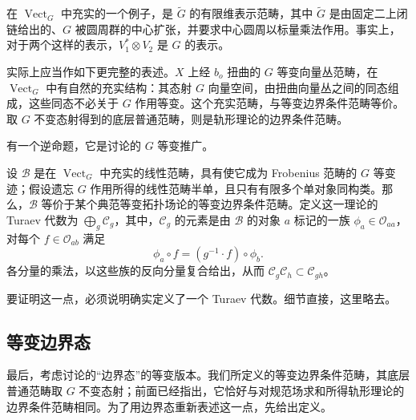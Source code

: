 在 $\operatorname{Vect}_G$ 中充实的一个例子，是 $\widetilde{G}$ 的有限维表示范畴，其中 $\widetilde{G}$ 是由固定二上闭链给出的、$G$ 被圆周群的中心扩张，并要求中心圆周以标量乘法作用。事实上，对于两个这样的表示，$V_1^*\otimes V_2$ 是 $G$ 的表示。

实际上应当作如下更完整的表述。$X$ 上经 $b_o$ 扭曲的 $G$ 等变向量丛范畴，在 $\operatorname{Vect}_G$ 中有自然的充实结构：其态射 $G$ 向量空间，由扭曲向量丛之间的同态组成，这些同态不必关于 $G$ 作用等变。这个充实范畴，与等变边界条件范畴等价。取 $G$ 不变态射得到的底层普通范畴，则是轨形理论的边界条件范畴。

有一个逆命题，它是讨论的 $G$ 等变推广。

\begin{theorem}\label{thm:2.19}
设 $\mathcal{B}$ 是在 $\operatorname{Vect}_G$ 中充实的线性范畴，具有使它成为 Frobenius 范畴的 $G$ 等变迹；假设遗忘 $G$ 作用所得的线性范畴半单，且只有有限多个单对象同构类。那么，$\mathcal{B}$ 等价于某个典范等变拓扑场论的等变边界条件范畴。定义这一理论的 Turaev 代数为 $\bigoplus_g\mathcal{C}_g$，其中，$\mathcal{C}_g$ 的元素是由 $\mathcal{B}$ 的对象 $a$ 标记的一族 $\phi_a\in\mathcal{O}_{aa}$，对每个 $f\in\mathcal{O}_{ab}$ 满足
\begin{equation}\label{eq:2.109}
\phi_a\circ f=(g^{-1}\cdot f)\circ\phi_b.
\end{equation}
各分量的乘法，以这些族的反向分量复合给出，从而 $\mathcal{C}_g\mathcal{C}_h\subset\mathcal{C}_{gh}$。
\end{theorem}

要证明这一点，必须说明确实定义了一个 Turaev 代数。细节直接，这里略去。

\subsection{等变边界态}\label{sec:2.6.6}

最后，考虑讨论的“边界态”的等变版本。我们所定义的等变边界条件范畴，其底层普通范畴取 $G$ 不变态射；前面已经指出，它恰好与对规范场求和所得轨形理论的边界条件范畴相同。为了用边界态重新表述这一点，先给出定义。

